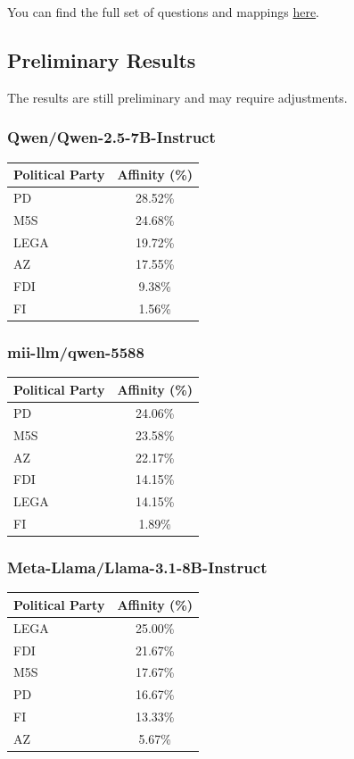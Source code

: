 \documentclass[10pt]{article}
\begin{document}
You can find the full set of questions and mappings \href{https://github.com/mii-llm/propaganda/blob/main/eval/italian-political-compass/src/italian_political_compass/data/weights.py}{here}.

\subsection*{Preliminary Results}

The results are still preliminary and may require adjustments.

\subsubsection*{Qwen/Qwen-2.5-7B-Instruct}
\begin{tabular}{|l|c|}
\hline
\textbf{Political Party} & \textbf{Affinity (\%)} \\
\hline
PD & 28.52\% \\
M5S & 24.68\% \\
LEGA & 19.72\% \\
AZ & 17.55\% \\
FDI & 9.38\% \\
FI & 1.56\% \\
\hline
\end{tabular}

\subsubsection*{mii-llm/qwen-5588}
\begin{tabular}{|l|c|}
\hline
\textbf{Political Party} & \textbf{Affinity (\%)} \\
\hline
PD & 24.06\% \\
M5S & 23.58\% \\
AZ & 22.17\% \\
FDI & 14.15\% \\
LEGA & 14.15\% \\
FI & 1.89\% \\
\hline
\end{tabular}

\subsubsection*{Meta-Llama/Llama-3.1-8B-Instruct}
\begin{tabular}{|l|c|}
\hline
\textbf{Political Party} & \textbf{Affinity (\%)} \\
\hline
LEGA & 25.00\% \\
FDI & 21.67\% \\
M5S & 17.67\% \\
PD & 16.67\% \\
FI & 13.33\% \\
AZ & 5.67\% \\
\hline
\end{tabular}
\end{document}
